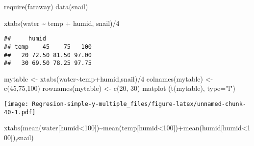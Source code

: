 \documentclass[
]{article}
\newenvironment{Shaded}{\begin{snugshade}}{\end{snugshade}}
\newcommand{\AttributeTok}[1]{\textcolor[rgb]{0.77,0.63,0.00}{#1}}
\newcommand{\DecValTok}[1]{\textcolor[rgb]{0.00,0.00,0.81}{#1}}
\newcommand{\FunctionTok}[1]{\textcolor[rgb]{0.00,0.00,0.00}{#1}}
\newcommand{\NormalTok}[1]{#1}
\newcommand{\OtherTok}[1]{\textcolor[rgb]{0.56,0.35,0.01}{#1}}
\newcommand{\SpecialCharTok}[1]{\textcolor[rgb]{0.00,0.00,0.00}{#1}}
\newcommand{\StringTok}[1]{\textcolor[rgb]{0.31,0.60,0.02}{#1}}
\begin{document}
\begin{Shaded}
\begin{Highlighting}[]
\FunctionTok{require}\NormalTok{(faraway)}
\FunctionTok{data}\NormalTok{(snail)}
\end{Highlighting}
\end{Shaded}

\begin{Shaded}
\begin{Highlighting}[]
\FunctionTok{xtabs}\NormalTok{(water }\SpecialCharTok{\textasciitilde{}}\NormalTok{ temp }\SpecialCharTok{+}\NormalTok{ humid, snail)}\SpecialCharTok{/}\DecValTok{4}
\end{Highlighting}
\end{Shaded}

\begin{verbatim}
##     humid
## temp    45    75   100
##   20 72.50 81.50 97.00
##   30 69.50 78.25 97.75
\end{verbatim}

\begin{Shaded}
\begin{Highlighting}[]
\NormalTok{mytable }\OtherTok{\textless{}{-}} \FunctionTok{xtabs}\NormalTok{(water}\SpecialCharTok{\textasciitilde{}}\NormalTok{temp}\SpecialCharTok{+}\NormalTok{humid,snail)}\SpecialCharTok{/}\DecValTok{4}
\FunctionTok{colnames}\NormalTok{(mytable) }\OtherTok{\textless{}{-}} \FunctionTok{c}\NormalTok{(}\DecValTok{45}\NormalTok{,}\DecValTok{75}\NormalTok{,}\DecValTok{100}\NormalTok{)}
\FunctionTok{rownames}\NormalTok{(mytable) }\OtherTok{\textless{}{-}} \FunctionTok{c}\NormalTok{(}\DecValTok{20}\NormalTok{, }\DecValTok{30}\NormalTok{)}
\FunctionTok{matplot}\NormalTok{ (}\FunctionTok{t}\NormalTok{(mytable), }\AttributeTok{type=}\StringTok{"l"}\NormalTok{)}
\end{Highlighting}
\end{Shaded}

\texttt{[image: Regresion-simple-y-multiple\_files/figure-latex/unnamed-chunk-40-1.pdf]}

\begin{Shaded}
\begin{Highlighting}[]
\FunctionTok{xtabs}\NormalTok{(}\FunctionTok{mean}\NormalTok{(water[humid}\SpecialCharTok{\textless{}}\DecValTok{100}\NormalTok{])}\SpecialCharTok{\textasciitilde{}}\FunctionTok{mean}\NormalTok{(temp[humid}\SpecialCharTok{\textless{}}\DecValTok{100}\NormalTok{])}\SpecialCharTok{+}\FunctionTok{mean}\NormalTok{(humid[humid}\SpecialCharTok{\textless{}}\DecValTok{100}\NormalTok{]),snail)}
\end{Highlighting}
\end{Shaded}
\end{document}
